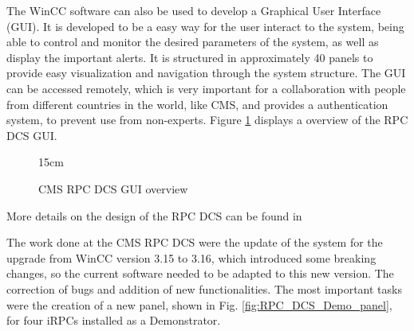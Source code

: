 The WinCC software can also be used to develop a Graphical User Interface (GUI). It is developed to be a easy way for the user interact to the system, being able to control and monitor the desired parameters of the system, as well as display the important alerts. It is structured in approximately 40 panels to provide easy visualization and navigation through the system structure. The GUI can be accessed remotely, which is very important for a collaboration with people from different countries in the world, like CMS, and provides a authentication system, to prevent use from non-experts. Figure \ref{fig:RPC_DCS_GUI} displays a overview of the RPC DCS GUI.

\begin{figure}[!htm]{15cm}
\caption{CMS RPC DCS GUI overview}%
\label{fig:RPC_DCS_GUI}
\end{figure}

More details on the design of the RPC DCS can be found in \cite{Polese:2010zz, Polese:2012zz}

The work done at the CMS RPC DCS were the update of the system for the upgrade from WinCC version 3.15 to 3.16, which introduced some breaking changes, so the current software needed to be adapted to this new version. The correction of bugs and addition of new functionalities. The most important tasks were the creation of a new panel, shown in Fig. \ref{fig:RPC_DCS_Demo_panel}, for four iRPCs installed as a Demonstrator.

